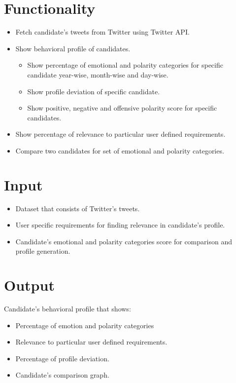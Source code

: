 \documentclass[oneside,a4paper,12pt]{pictreport}
\begin{document}
\section{Functionality}
\begin{itemize}
\item Fetch candidate's tweets from Twitter using Twitter API.
\item Show behavioral profile of candidates.
\begin{itemize}
\item Show percentage of emotional and polarity categories for specific candidate year-wise, month-wise and day-wise.
\item Show profile deviation of specific candidate.
\item Show positive, negative and offensive polarity score for specific candidates.
\end{itemize}
\item Show percentage of relevance to particular user defined requirements.
\item Compare two candidates for set of emotional and polarity categories.
\end{itemize} 

\section{Input}
\begin{itemize}
\item Dataset that consists of Twitter's tweets.
\item User specific requirements for finding relevance in candidate's profile.
\item Candidate's emotional and polarity categories score for comparison and profile generation.
\end{itemize}


\section{Output}
Candidate's behavioral profile that shows:
\begin{itemize}
\item Percentage of emotion and polarity categories
\item Relevance to particular user defined requirements.
\item Percentage of profile deviation.
\item Candidate's comparison graph.
\end{itemize}
\end{document}
